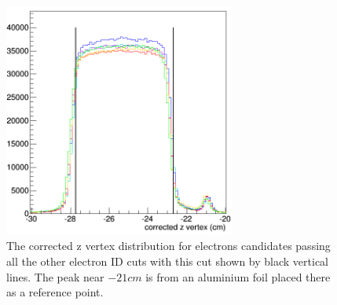 %
\begin{figure}[htp]
\centering
\includegraphics[width=3in]{figures/e_zvertexCut.png}
\caption{The corrected z vertex distribution for electrons candidates passing all the other electron ID cuts with this cut shown by black vertical lines. The peak near $-21 cm$ is from an aluminium foil placed there as a reference point.}
\label{fig:e_zvertexCut}
\end{figure}
%
\clearpage
